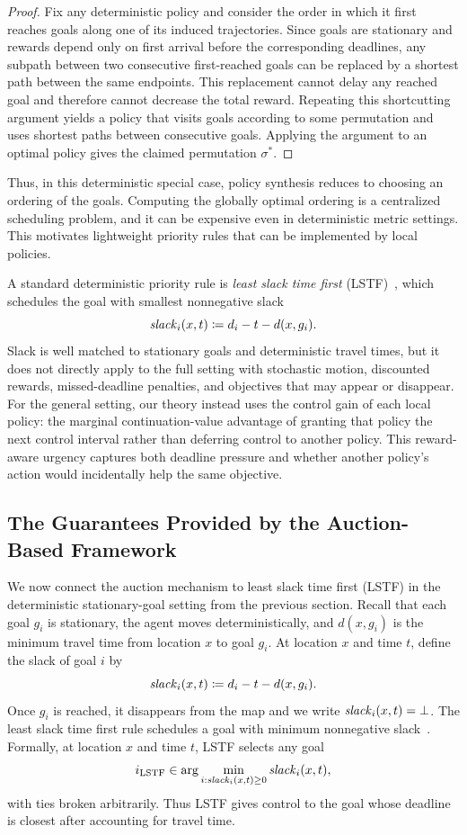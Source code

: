 \begin{proof}
  Fix any deterministic policy and consider the order in which it first reaches goals along one of its induced trajectories.
  Since goals are stationary and rewards depend only on first arrival before the corresponding deadlines, any subpath between two consecutive first-reached goals can be replaced by a shortest path between the same endpoints.
  This replacement cannot delay any reached goal and therefore cannot decrease the total reward.
  Repeating this shortcutting argument yields a policy that visits goals according to some permutation and uses shortest paths between consecutive goals.
  Applying the argument to an optimal policy gives the claimed permutation \(\sigma^*\).
\end{proof}

Thus, in this deterministic special case, policy synthesis reduces to choosing an ordering of the goals.
Computing the globally optimal ordering is a centralized scheduling problem, and it can be expensive even in deterministic metric settings.
This motivates lightweight priority rules that can be implemented by local policies.

A standard deterministic priority rule is \emph{least slack time first} (LSTF)~\citep{brown2020optimal}, which schedules the goal with smallest nonnegative slack
\[
  \mathit{slack}_i(x,t)\coloneqq d_i-t-d(x,g_i).
\]
Slack is well matched to stationary goals and deterministic travel times, but it does not directly apply to the full \momdp setting with stochastic motion, discounted rewards, missed-deadline penalties, and objectives that may appear or disappear.
For the general setting, our theory instead uses the control gain of each local policy: the marginal continuation-value advantage of granting that policy the next control interval rather than deferring control to another policy.
This reward-aware urgency captures both deadline pressure and whether another policy's action would incidentally help the same objective.

\subsection{The Guarantees Provided by the Auction-Based Framework}
\label{app:lstf-analysis}

We now connect the auction mechanism to least slack time first (LSTF) in the deterministic stationary-goal setting from the previous section.
Recall that each goal \(g_i\) is stationary, the agent moves deterministically, and \(d(x,g_i)\) is the minimum travel time from location \(x\) to goal \(g_i\).
At location \(x\) and time \(t\), define the slack of goal \(i\) by
\[
  \mathit{slack}_i(x,t)\coloneqq d_i-t-d(x,g_i).
\]
Once \(g_i\) is reached, it disappears from the map and we write \(\mathit{slack}_i(x,t)=\bot\).
The least slack time first rule schedules a goal with minimum nonnegative slack~\citep{brown2020optimal}.
Formally, at location \(x\) and time \(t\), LSTF selects any goal
\[
  i_{\mathrm{LSTF}}\in
  \arg\min_{i:\mathit{slack}_i(x,t)\geq 0}
  \mathit{slack}_i(x,t),
\]
with ties broken arbitrarily.
Thus LSTF gives control to the goal whose deadline is closest after accounting for travel time.

